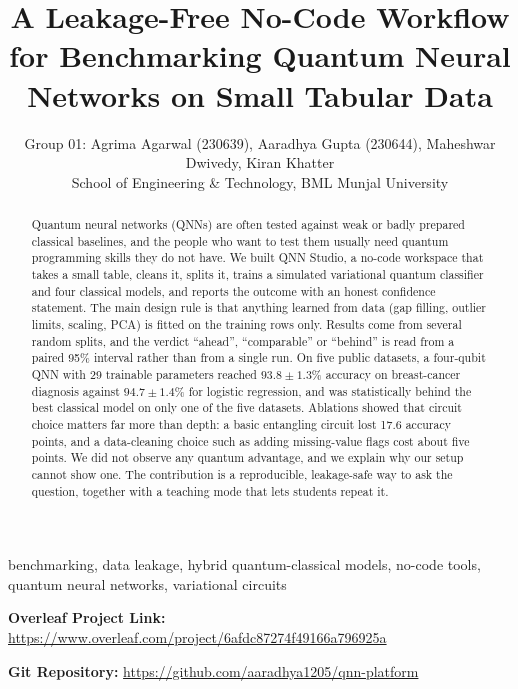 \documentclass[12pt,onecolumn,draftclsnofoot]{IEEEtran}
\begin{document}
\title{A Leakage-Free No-Code Workflow for Benchmarking Quantum Neural Networks on Small Tabular Data}

\author{Group 01: Agrima Agarwal (230639), Aaradhya Gupta (230644), Maheshwar Dwivedy, Kiran Khatter\\
School of Engineering \& Technology, BML Munjal University}

\maketitle

\begin{abstract}
Quantum neural networks (QNNs) are often tested against weak or badly prepared classical baselines, and the people who want to test them usually need quantum programming skills they do not have. We built QNN Studio, a no-code workspace that takes a small table, cleans it, splits it, trains a simulated variational quantum classifier and four classical models, and reports the outcome with an honest confidence statement. The main design rule is that anything learned from data (gap filling, outlier limits, scaling, PCA) is fitted on the training rows only. Results come from several random splits, and the verdict ``ahead'', ``comparable'' or ``behind'' is read from a paired 95\% interval rather than from a single run. On five public datasets, a four-qubit QNN with 29 trainable parameters reached $93.8\pm1.3\%$ accuracy on breast-cancer diagnosis against $94.7\pm1.4\%$ for logistic regression, and was statistically behind the best classical model on only one of the five datasets. Ablations showed that circuit choice matters far more than depth: a basic entangling circuit lost 17.6 accuracy points, and a data-cleaning choice such as adding missing-value flags cost about five points. We did not observe any quantum advantage, and we explain why our setup cannot show one. The contribution is a reproducible, leakage-safe way to ask the question, together with a teaching mode that lets students repeat it.
\end{abstract}

\begin{IEEEkeywords}
benchmarking, data leakage, hybrid quantum-classical models, no-code tools, quantum neural networks, variational circuits
\end{IEEEkeywords}

\noindent\textbf{Overleaf Project Link:} \url{https://www.overleaf.com/project/6afdc87274f49166a796925a}

\noindent\textbf{Git Repository:} \url{https://github.com/aaradhya1205/qnn-platform}
\end{document}
